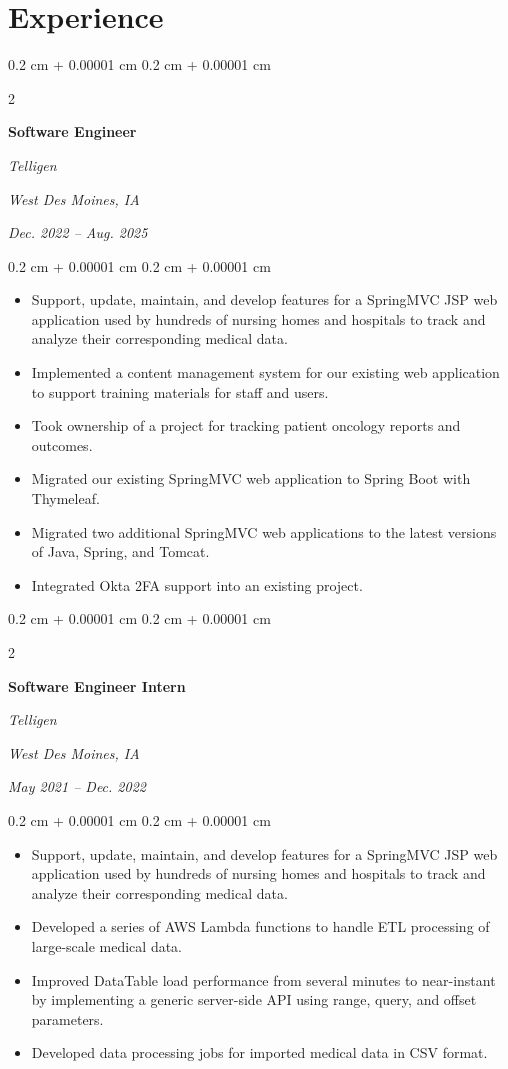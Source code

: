 \documentclass[10pt, letterpaper]{article}
\newenvironment{highlights}{
    \begin{itemize}[
        topsep=0.10 cm,
        parsep=0.10 cm,
        partopsep=0pt,
        itemsep=0pt,
        leftmargin=0.4 cm + 10pt
    ]
}{
    \end{itemize}
} %
\newenvironment{onecolentry}{
    \begin{adjustwidth}{
        0.2 cm + 0.00001 cm
    }{
        0.2 cm + 0.00001 cm
    }
}{
    \end{adjustwidth}
} %
\newenvironment{twocolentry}[2][]{
    \onecolentry
    \def\secondColumn{#2}
    \setcolumnwidth{\fill, 4.5 cm}
    \begin{paracol}{2}
}{
    \switchcolumn \raggedleft \secondColumn
    \end{paracol}
    \endonecolentry
} %
\begin{document}
\section{Experience}

\begin{twocolentry}{
		\textit{West Des Moines, IA}    
		            
		\textit{Dec. 2022 – Aug. 2025}}
	\textbf{Software Engineer}
	            
	\textit{Telligen}
\end{twocolentry}

\vspace{0.10 cm}
\begin{onecolentry}
	\begin{highlights}
		\item Support, update, maintain, and develop features for a SpringMVC JSP web application used by hundreds of nursing homes and hospitals to track and analyze their corresponding medical data.
		\item Implemented a content management system for our existing web application to support training materials for staff and users.
		\item Took ownership of a project for tracking patient oncology reports and outcomes.
		\item Migrated our existing SpringMVC web application to Spring Boot with Thymeleaf.
		\item Migrated two additional SpringMVC web applications to the latest versions of Java, Spring, and Tomcat.
		\item Integrated Okta 2FA support into an existing project.
	\end{highlights}
\end{onecolentry}

\vspace{0.2 cm}

\begin{twocolentry}{
		\textit{West Des Moines, IA}    
		            
		\textit{May 2021 – Dec. 2022}}
	\textbf{Software Engineer Intern}
	            
	\textit{Telligen}
\end{twocolentry}

\vspace{0.10 cm}
\begin{onecolentry}
	\begin{highlights}
		\item Support, update, maintain, and develop features for a SpringMVC JSP web application used by hundreds of nursing homes and hospitals to track and analyze their corresponding medical data.
		\item Developed a series of AWS Lambda functions to handle ETL processing of large-scale medical data.
		\item Improved DataTable load performance from several minutes to near-instant by implementing a generic server-side API using range, query, and offset parameters.
		\item Developed data processing jobs for imported medical data in CSV format.
	\end{highlights}
\end{onecolentry}
\end{document}
